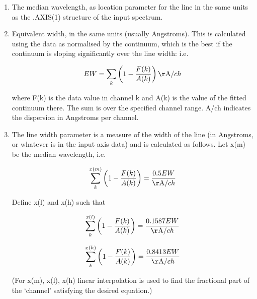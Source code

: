\begin{enumerate}
\item
   The median wavelength, as location parameter for the line in the
   same units as the .AXIS(1) structure of the input spectrum.

\item
   Equivalent width, in the same units (usually Angstroms). This is
   calculated using the data as normalised by the continuum, which is
   the best if the continuum is sloping significantly over the line
   width: i.e.

\begin{displaymath}
   EW = \sum_k \left( 1 - {F(k)\over A(k)} \right) {{\rm \AA}/ch}
\end{displaymath}

   where F(k) is the data value in channel k and A(k) is the value
   of the fitted continuum there. The sum is over the specified channel
   range. A/ch indicates the dispersion in Angstroms per
   channel.

\item
   The line width parameter is a measure of the width of the line (in
   Angstroms, or whatever is in the input axis data) and is calculated
   as follows. Let x(m) be the median wavelength, i.e.

\begin{displaymath}
   \sum_k^{x(m)} \left( 1 - {F(k)\over A(k)} \right)
      = {0.5 EW \over {\rm \AA}/ch}
\end{displaymath}

   Define x(l) and x(h) such that

\begin{displaymath}
   \sum_k^{x(l)} \left( 1 - {F(k)\over A(k)} \right)
      = {0.1587 EW \over {\rm \AA}/ch}
\end{displaymath}

\begin{displaymath}
   \sum_k^{x(h)} \left( 1 - {F(k)\over A(k)} \right)
      = {0.8413 EW \over {\rm \AA}/ch}
\end{displaymath}


   (For x(m), x(l), x(h) linear interpolation is used to find the
   fractional part of the `channel' satisfying the desired equation.)


\end{enumerate}
